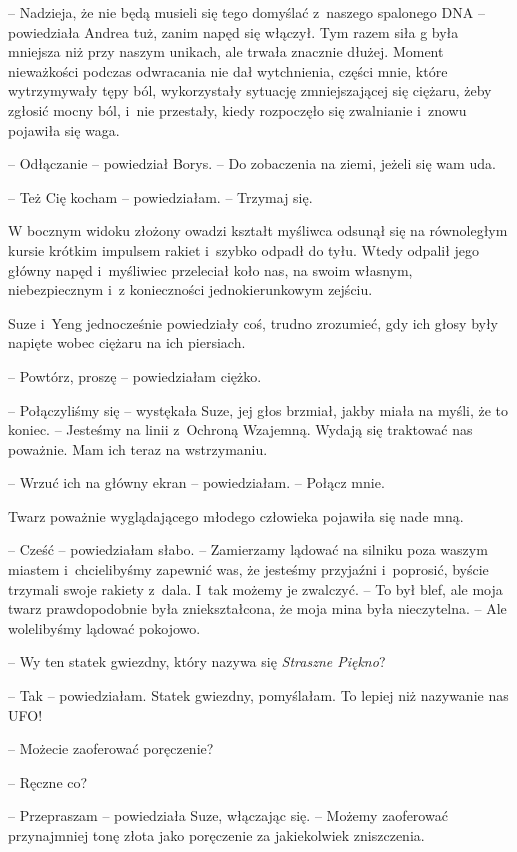 \documentclass[oneside,polish,11pt,sfheadings]{mwbk}
\begin{document}
-- Nadzieja, że nie będą musieli się tego domyślać z~naszego spalonego
DNA -- powiedziała Andrea tuż, zanim napęd się włączył. Tym razem siła g
była mniejsza niż przy naszym unikach, ale trwała znacznie dłużej.
Moment nieważkości podczas odwracania nie dał wytchnienia, części mnie,
które wytrzymywały tępy ból, wykorzystały sytuację zmniejszającej się
ciężaru, żeby zgłosić mocny ból, i~nie przestały, kiedy rozpoczęło się
zwalnianie i~znowu pojawiła się waga.

-- Odłączanie -- powiedział Borys. -- Do zobaczenia na ziemi, jeżeli się
wam uda.

-- Też Cię kocham -- powiedziałam. -- Trzymaj się.

W bocznym widoku złożony owadzi kształt myśliwca odsunął się na
równoległym kursie krótkim impulsem rakiet i~szybko odpadł do tyłu.
Wtedy odpalił jego główny napęd i~myśliwiec przeleciał koło nas, na
swoim własnym, niebezpiecznym i~z konieczności jednokierunkowym zejściu.

Suze i~Yeng jednocześnie powiedziały coś, trudno zrozumieć, gdy ich
głosy były napięte wobec ciężaru na ich piersiach.

-- Powtórz, proszę -- powiedziałam ciężko.

-- Połączyliśmy się -- wystękała Suze, jej głos brzmiał, jakby miała na
myśli, że to koniec. -- Jesteśmy na linii z~Ochroną Wzajemną. Wydają się
traktować nas poważnie. Mam ich teraz na wstrzymaniu.

-- Wrzuć ich na główny ekran -- powiedziałam. -- Połącz mnie.

Twarz poważnie wyglądającego młodego człowieka pojawiła się nade mną. 

-- Cześć -- powiedziałam słabo. -- Zamierzamy lądować na silniku poza waszym
miastem i~chcielibyśmy zapewnić was, że jesteśmy przyjaźni i~poprosić,
byście trzymali swoje rakiety z~dala. I~tak możemy je zwalczyć. -- To był
blef, ale moja twarz prawdopodobnie była zniekształcona, że moja mina
była nieczytelna. -- Ale wolelibyśmy lądować pokojowo.

-- Wy ten statek gwiezdny, który nazywa się \textit{Straszne Piękno}?

-- Tak -- powiedziałam. Statek gwiezdny, pomyślałam. To lepiej niż
nazywanie nas UFO!

-- Możecie zaoferować poręczenie?

-- Ręczne co?

-- Przepraszam -- powiedziała Suze, włączając się. -- Możemy zaoferować
przynajmniej tonę złota jako poręczenie za jakiekolwiek zniszczenia.
\end{document}
